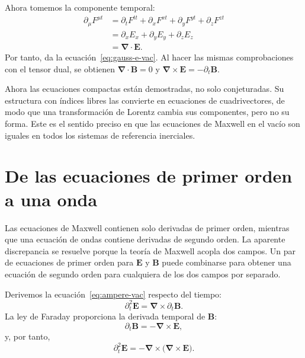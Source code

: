 Ahora tomemos la componente temporal:
\begin{align}
\partial_\mu F^{\mu t}
&=\partial_tF^{tt}
  +\partial_xF^{xt}
  +\partial_yF^{yt}
  +\partial_zF^{zt}\\
&=\partial_xE_x+\partial_yE_y+\partial_zE_z\\
&=\boldsymbol\nabla\cdot\mathbf E.
\end{align}
Por tanto, da la ecuación~\eqref{eq:gauss-e-vac}. Al hacer las mismas comprobaciones con el tensor dual, se obtienen
\(\boldsymbol\nabla\cdot\mathbf B=0\) y
\(\boldsymbol\nabla\times\mathbf E=-\partial_t\mathbf B\).

Ahora las ecuaciones compactas están demostradas, no solo conjeturadas. Su estructura con índices libres las convierte en ecuaciones de cuadrivectores, de modo que una transformación de Lorentz cambia sus componentes, pero no su forma. Este es el sentido preciso en que las ecuaciones de Maxwell en el vacío son iguales en todos los sistemas de referencia inerciales.

\section{De las ecuaciones de primer orden a una onda}

Las ecuaciones de Maxwell contienen solo derivadas de primer orden, mientras que una ecuación de ondas contiene derivadas de segundo orden. La aparente discrepancia se resuelve porque la teoría de Maxwell acopla dos campos. Un par de ecuaciones de primer orden para \(\mathbf E\) y \(\mathbf B\) puede combinarse para obtener una ecuación de segundo orden para cualquiera de los dos campos por separado.

Derivemos la ecuación~\eqref{eq:ampere-vac} respecto del tiempo:
\begin{equation}
\partial_t^2\mathbf E
=\boldsymbol\nabla\times\partial_t\mathbf B.
\end{equation}
La ley de Faraday proporciona la derivada temporal de \(\mathbf B\):
\begin{equation}
\partial_t\mathbf B=-\boldsymbol\nabla\times\mathbf E,
\end{equation}
y, por tanto,
\begin{equation}
\partial_t^2\mathbf E
=-\boldsymbol\nabla\times
  \bigl(\boldsymbol\nabla\times\mathbf E\bigr).
\label{eq:double-curl}
\end{equation}

